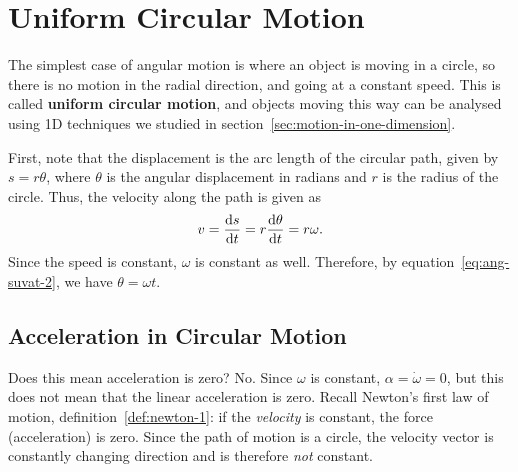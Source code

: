 \documentclass[../classical_mechanics.tex]{subfiles}
\begin{document}
    \section{Uniform Circular Motion}\label{sec:uniform-circular-motion}
        The simplest case of angular motion is where an object is moving in a circle, so there is no motion in the radial direction, and going at a constant speed.
        This is called \textbf{uniform circular motion}, and objects moving this way can be analysed using 1D techniques we studied in section~\ref{sec:motion-in-one-dimension}.
        \begin{figure}[H]
            \centering
        \end{figure}
        First, note that the displacement is the arc length of the circular path, given by $s=r\theta$, where $\theta$ is the angular displacement in radians and $r$ is the radius of the circle.
        Thus, the velocity along the path is given as
        \begin{equation}\label{eq:ucm-speed}
            v=\dv{s}{t}=r\dv{\theta}{t}=r\omega.
        \end{equation}
        Since the speed is constant, $\omega$ is constant as well.
        Therefore, by equation~\ref{eq:ang-suvat-2}, we have $\theta=\omega t$.

        \subsection{Acceleration in Circular Motion}\label{subsec:acceleration-in-circular-motion}
            Does this mean acceleration is zero?
            No.
            Since $\omega$ is constant, $\alpha=\dot{\omega}=0$, but this does not mean that the linear acceleration is zero.
            Recall Newton's first law of motion, definition~\ref{def:newton-1}: if the \textit{velocity} is constant, the force (acceleration) is zero.
            Since the path of motion is a circle, the velocity vector is constantly changing direction and is therefore \textit{not} constant.
\end{document}
